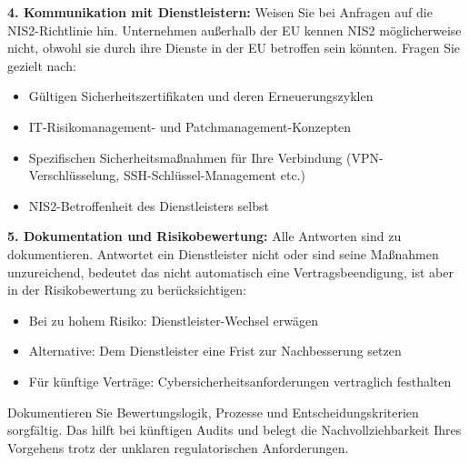 \textbf{4. Kommunikation mit Dienstleistern:} Weisen Sie bei Anfragen auf die NIS2-Richtlinie hin. Unternehmen außerhalb der EU kennen NIS2 möglicherweise nicht, obwohl sie durch ihre Dienste in der EU betroffen sein könnten. Fragen Sie gezielt nach:
\begin{itemize}
    \item Gültigen Sicherheitszertifikaten und deren Erneuerungszyklen
    \item IT-Risikomanagement- und Patchmanagement-Konzepten
    \item Spezifischen Sicherheitsmaßnahmen für Ihre Verbindung (VPN-Verschlüsselung, SSH-Schlüssel-Management etc.)
    \item NIS2-Betroffenheit des Dienstleisters selbst
\end{itemize}
\newpage
\textbf{5. Dokumentation und Risikobewertung:} Alle Antworten sind zu dokumentieren. Antwortet ein Dienstleister nicht oder sind seine Maßnahmen unzureichend, bedeutet das nicht automatisch eine Vertragsbeendigung, ist aber in der Risikobewertung zu berücksichtigen:
\begin{itemize}
    \item Bei zu hohem Risiko: Dienstleister-Wechsel erwägen
    \item Alternative: Dem Dienstleister eine Frist zur Nachbesserung setzen
    \item Für künftige Verträge: Cybersicherheitsanforderungen vertraglich festhalten
\end{itemize}

Dokumentieren Sie Bewertungslogik, Prozesse und Entscheidungskriterien sorgfältig. Das hilft bei künftigen Audits und belegt die Nachvollziehbarkeit Ihres Vorgehens trotz der unklaren regulatorischen Anforderungen.
